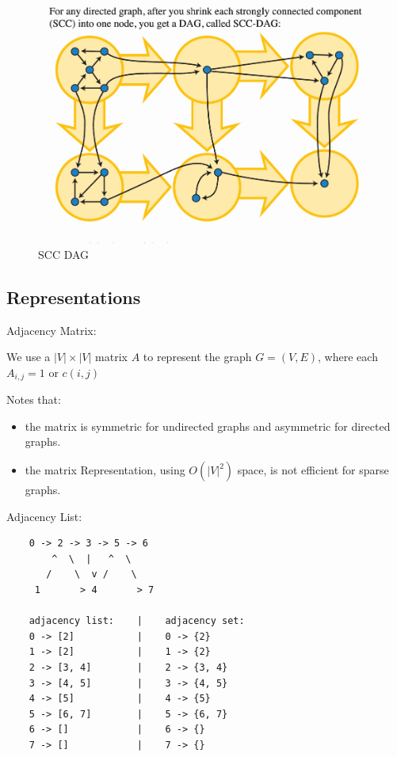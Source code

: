 \documentclass[12pt,a4paper]{article}
\begin{document}
\begin{figure}[h]
    \centering
    \includegraphics[width=\textwidth]{./images/scc_dag.png}
    \caption{SCC DAG}
    \label{fig:scc_dag}
\end{figure}

\subsection{Representations}

Adjacency Matrix:

We use a $|V| \times |V|$ matrix $A$ to represent the graph $G = (V, E)$,
where each $A_{i,j} = 1 \text{ or } c(i, j)$

Notes that:

\begin{itemize}
    \item the matrix is symmetric for undirected graphs and asymmetric for directed graphs.
    \item the matrix Representation, using $O(|V|^2)$ space, is not efficient for sparse graphs.
\end{itemize}

Adjacency List:

\begin{verbatim}
    0 -> 2 -> 3 -> 5 -> 6
        ^  \  |   ^  \
       /    \  v /    \
     1       > 4       > 7

    adjacency list:    |    adjacency set:
    0 -> [2]           |    0 -> {2}
    1 -> [2]           |    1 -> {2}
    2 -> [3, 4]        |    2 -> {3, 4}
    3 -> [4, 5]        |    3 -> {4, 5}
    4 -> [5]           |    4 -> {5}
    5 -> [6, 7]        |    5 -> {6, 7}
    6 -> []            |    6 -> {}
    7 -> []            |    7 -> {}
\end{verbatim}
\end{document}
